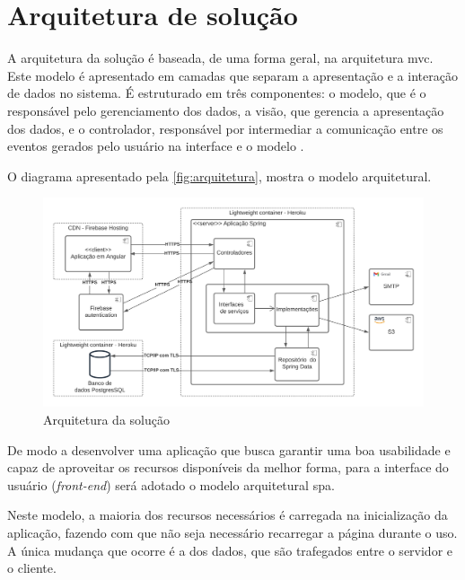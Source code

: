 \section{Arquitetura de solução}

A arquitetura da solução é baseada, de uma forma geral, na arquitetura \ac{mvc}. Este modelo é apresentado em camadas que separam a apresentação e a interação de dados no sistema. É estruturado em três componentes: o modelo, que é o responsável pelo gerenciamento dos dados, a visão, que gerencia a apresentação dos dados, e o controlador, responsável por intermediar a comunicação entre os eventos gerados pelo usuário na interface e o modelo \cite{engenharia-de-software:2018}.

O diagrama apresentado pela \autoref{fig:arquitetura}, mostra o modelo arquitetural.

\begin{figure}[htb]
    \centering
	\includegraphics[width=16cm]{imagens/Arquitetura.png}
	\caption{\label{fig:arquitetura} Arquitetura da solução}
\end{figure}
 
 
De modo a desenvolver uma aplicação que busca garantir uma boa usabilidade e capaz de aproveitar os recursos disponíveis da melhor forma, para a interface do usuário (\textit{\gls{front-end}}) será adotado o modelo arquitetural \ac{spa}. 


Neste modelo, a maioria dos recursos necessários é carregada na inicialização da aplicação, fazendo com que não seja necessário recarregar a página durante o uso. A única mudança que ocorre é a dos dados, que são trafegados entre o servidor e o cliente.


